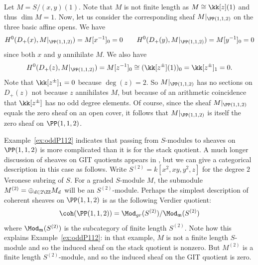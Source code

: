 %

\begin{example}\label{ex:oddP112}
  Let $M=S/(x,y)(1)$.  Note that $M$ is not finite length as $M\cong \kk[z](1)$ and thus $\dim M = 1$.  Now, let us consider the corresponding sheaf $M|_{\PP(1,1,2)}$ on the three basic affine opens.  We have
  \[
  H^0(D_+(x), M|_{\PP(1,1,2)}) = M[x^{-1}]_0 =0 \qquad H^0(D_+(y), M|_{\PP(1,1,2)}) = M[y^{-1}]_0 =0
  \]
  since both $x$ and $y$ annihilate $M$.  We also have
  \[
  H^0(D_+(z), M|_{\PP(1,1,2)})= M[z^{-1}]_0 \cong (\kk[z^{\pm}](1))_0 = \kk[z^{\pm}]_1 = 0.
  \]
  Note that $\kk[z^{\pm}]_1 = 0$ because $\deg(z)=2$.  So $M|_{\PP(1,1,2)}$ has no sections on $D_+(z)$ not because $z$ annihilates $M$, but because of an arithmetic coincidence that $\kk[z^{\pm}]$ has no odd degree elements.  Of course, since the sheaf $M|_{\PP(1,1,2)}$ equals the zero sheaf on an open cover, it follows that $M|_{\PP(1,1,2)}$ is itself the zero sheaf on $\PP(1,1,2)$.
\end{example}

Example~\ref{ex:oddP112} indicates that passing from $S$-modules to sheaves on $\PP(1,1,2)$ is more complicated than it is for the stack quotient.  A much longer discussion of sheaves on GIT quotients appears in \cite[Chapter 5]{CLS2011}, but we can give a categorical description in this case as follows.  Write $S^{(2)}=k[x^2,xy,y^2,z]$ for the degree $2$ Veronese subring of $S$.  For a graded $S$-module $M$, the submodule $M^{(2)} = \oplus_{d \in 2\ZZ} M_d$ will be an $S^{(2)}$-module.  Perhaps the simplest description of coherent sheaves on $\PP(1,1,2)$ is as the following Verdier quotient:
\[
\coh(\PP(1,1,2)) = \Mod_{gr}(S^{(2)}) / \Mod_{\mathfrak m}(S^{(2)})
\]
where $\Mod_{\mathfrak m}(S^{(2)})$ is the subcategory of finite length $S^{(2)}$.  Note how this explains Example~\ref{ex:oddP112}: in that example, $M$ is not a finite length $S$-module and so the induced sheaf on the stack quotient is nonzero.  But $M^{(2)}$ is a finite length $S^{(2)}$-module, and so the induced sheaf on the GIT quotient is zero.

